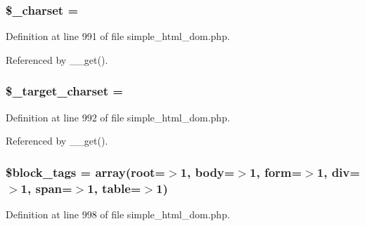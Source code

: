 \subsubsection[{\$\+\_\+charset}]{\setlength{\rightskip}{0pt plus 5cm}\$\+\_\+charset = \textquotesingle{}\textquotesingle{}}\label{classsimple__html__dom_ad6b00a32790b456a2f1668b2010a262e}


Definition at line 991 of file simple\+\_\+html\+\_\+dom.\+php.



Referenced by \+\_\+\+\_\+get().

\hypertarget{classsimple__html__dom_a8f23f043ea2af2e56d97bebf17347f23}{}
\subsubsection[{\$\+\_\+target\+\_\+charset}]{\setlength{\rightskip}{0pt plus 5cm}\$\+\_\+target\+\_\+charset = \textquotesingle{}\textquotesingle{}}\label{classsimple__html__dom_a8f23f043ea2af2e56d97bebf17347f23}


Definition at line 992 of file simple\+\_\+html\+\_\+dom.\+php.



Referenced by \+\_\+\+\_\+get().

\hypertarget{classsimple__html__dom_ac513b8dc3142f886d0609b7893fe6026}{}
\subsubsection[{\$block\+\_\+tags}]{\setlength{\rightskip}{0pt plus 5cm}\$block\+\_\+tags = array(\textquotesingle{}root\textquotesingle{}=$>$1, \textquotesingle{}body\textquotesingle{}=$>$1, \textquotesingle{}form\textquotesingle{}=$>$1, \textquotesingle{}div\textquotesingle{}=$>$1, \textquotesingle{}span\textquotesingle{}=$>$1, \textquotesingle{}table\textquotesingle{}=$>$1)\hspace{0.3cm}{\ttfamily [protected]}}\label{classsimple__html__dom_ac513b8dc3142f886d0609b7893fe6026}


Definition at line 998 of file simple\+\_\+html\+\_\+dom.\+php.

